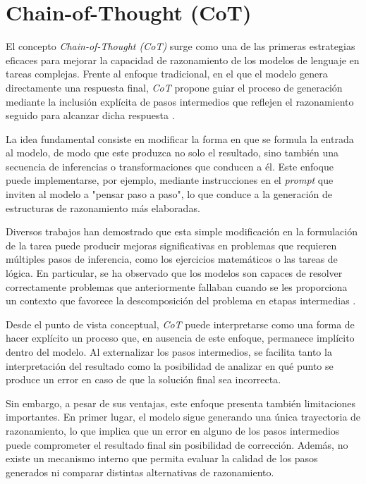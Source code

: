 \documentclass[12pt,a4paper,twoside,openright]{book}
\begin{document}
\section{Chain-of-Thought (CoT)}

El concepto \emph{Chain-of-Thought (CoT)} surge como una de las primeras estrategias eficaces para mejorar la capacidad de razonamiento de los modelos de lenguaje en tareas complejas. Frente al enfoque tradicional, en el que el modelo
genera directamente una respuesta final, \emph{CoT} propone guiar el proceso de generación mediante la inclusión explícita de pasos intermedios que reflejen el razonamiento seguido para alcanzar dicha respuesta \cite{wei2022chain}.

La idea fundamental consiste en modificar la forma en que se formula la entrada al modelo, de modo que este produzca no solo el resultado, sino también una secuencia de inferencias o transformaciones que conducen a él. Este enfoque
puede implementarse, por ejemplo, mediante instrucciones en el \emph{prompt} que inviten al modelo a "pensar paso a paso", lo que conduce a la generación de estructuras de razonamiento más elaboradas.

Diversos trabajos han demostrado que esta simple modificación en la formulación de la tarea puede producir mejoras significativas en problemas que requieren múltiples pasos de inferencia, como los ejercicios matemáticos o las tareas
de lógica. En particular, se ha observado que los modelos son capaces de resolver correctamente problemas que anteriormente fallaban cuando se les proporciona un contexto que favorece la descomposición del problema en etapas
intermedias \cite{wei2022chain}.

Desde el punto de vista conceptual, \emph{CoT} puede interpretarse como una forma de hacer explícito un proceso que, en ausencia de este enfoque, permanece implícito dentro del modelo. Al externalizar los pasos intermedios, se facilita
tanto la interpretación del resultado como la posibilidad de analizar en qué punto se produce un error en caso de que la solución final sea incorrecta.


Sin embargo, a pesar de sus ventajas, este enfoque presenta también limitaciones importantes. En primer lugar, el modelo sigue generando una única trayectoria de razonamiento, lo que implica que un error en alguno de los pasos intermedios
puede comprometer el resultado final sin posibilidad de corrección. Además, no existe un mecanismo interno que permita evaluar la calidad de los pasos generados ni comparar distintas alternativas de razonamiento.
\end{document}
